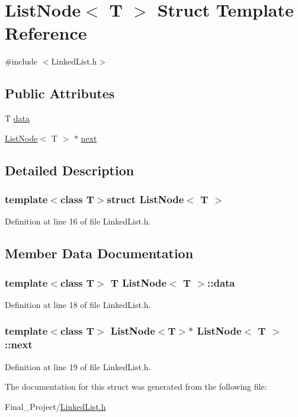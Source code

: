 \hypertarget{structListNode}{\section{List\-Node$<$ T $>$ Struct Template Reference}
\label{structListNode}
}


{\ttfamily \#include $<$Linked\-List.\-h$>$}

\subsection*{Public Attributes}
\begin{DoxyCompactItemize}
\item 
T \hyperlink{structListNode_a935e06f21b246fb3a0987dd3f9d28528}{data}
\item 
\hyperlink{structListNode}{List\-Node}$<$ T $>$ $\ast$ \hyperlink{structListNode_a97909c9598053ffd24b77ec715f745f1}{next}
\end{DoxyCompactItemize}


\subsection{Detailed Description}
\subsubsection*{template$<$class T$>$struct List\-Node$<$ T $>$}



Definition at line 16 of file Linked\-List.\-h.



\subsection{Member Data Documentation}
\hypertarget{structListNode_a935e06f21b246fb3a0987dd3f9d28528}{
\subsubsection[{data}]{\setlength{\rightskip}{0pt plus 5cm}template$<$class T$>$ T {\bf List\-Node}$<$ T $>$\-::data}}\label{structListNode_a935e06f21b246fb3a0987dd3f9d28528}


Definition at line 18 of file Linked\-List.\-h.

\hypertarget{structListNode_a97909c9598053ffd24b77ec715f745f1}{
\subsubsection[{next}]{\setlength{\rightskip}{0pt plus 5cm}template$<$class T$>$ {\bf List\-Node}$<$T$>$$\ast$ {\bf List\-Node}$<$ T $>$\-::next}}\label{structListNode_a97909c9598053ffd24b77ec715f745f1}


Definition at line 19 of file Linked\-List.\-h.



The documentation for this struct was generated from the following file\-:\begin{DoxyCompactItemize}
\item 
Final\-\_\-\-Project/\hyperlink{LinkedList_8h}{Linked\-List.\-h}\end{DoxyCompactItemize}
